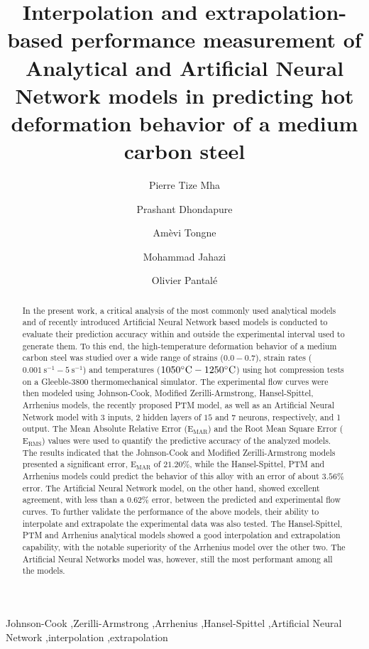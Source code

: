 \documentclass[twoside,english,1p,final,sort&compress]{elsarticle}
\theoremstyle{plain}
\DeclareRobustCommand{\RMSE}{\text{E}_\text{RMS}}
\DeclareRobustCommand{\MARE}{\text{E}_\text{MAR}}
\DeclareRobustCommand{\ps}{\text{s}^{-1}}
\begin{document}
\begin{frontmatter}

\title{Interpolation and extrapolation-based performance measurement of Analytical and Artificial Neural Network models in predicting hot deformation behavior of a medium carbon steel}

\author[LGP]{Pierre Tize Mha}
\author[ETS]{Prashant Dhondapure}
\author[LGP]{Amèvi Tongne}
\author[ETS]{Mohammad Jahazi}
\author[LGP]{Olivier Pantalé}


\address[LGP]{Laboratoire Génie de Production, INP/ENIT, Université de Toulouse, 47 Av d'Azereix, Tarbes, 65016, France}
\address[ETS]{École de technologie supérieure, 1100 Notre Dame St. W., Montreal, QC H3C 1K3, Canada}

\begin{abstract}
In the present work, a critical analysis of the most commonly used analytical models and of recently introduced Artificial Neural Network based models is conducted to evaluate their prediction accuracy within and outside the experimental interval used to generate them.
To this end, the high-temperature deformation behavior of a medium carbon steel was studied over a wide range of strains ($0.0-0.7$), strain rates ($0.001~\ps-5~\ps$) and temperatures ($1050\celsius-1250\celsius$) using hot compression tests on a Gleeble-3800 thermomechanical simulator.
The experimental flow curves were then modeled using Johnson-Cook, Modified Zerilli-Armstrong, Hansel-Spittel, Arrhenius models, the recently proposed PTM model, as well as an Artificial Neural Network model with $3$ inputs, $2$ hidden layers of $15$ and $7$ neurons, respectively, and 1 output.
The Mean Absolute Relative Error ($\MARE$) and the Root Mean Square Error ($\RMSE$) values were used to quantify the predictive accuracy of the analyzed models.
The results indicated that the Johnson-Cook and Modified Zerilli-Armstrong models presented a significant error, $\MARE$ of $21.20\%$, while the Hansel-Spittel, PTM and Arrhenius models could predict the behavior of this alloy with an error of about $3.56\%$ error.
The Artificial Neural Network model, on the other hand, showed excellent agreement, with less than a $0.62\%$ error, between the predicted and experimental flow curves.
To further validate the performance of the above models, their ability to interpolate and extrapolate the experimental data was also tested.
The Hansel-Spittel, PTM and Arrhenius analytical models showed a good interpolation and extrapolation capability, with the notable superiority of the Arrhenius model over the other two.
The Artificial Neural Networks model was, however, still the most performant among all the models.
\end{abstract}

\begin{keyword}
Johnson-Cook \sep Zerilli-Armstrong \sep Arrhenius \sep Hansel-Spittel \sep Artificial Neural Network \sep interpolation \sep extrapolation
\end{keyword}

\end{frontmatter}
\linenumbers
\end{document}
